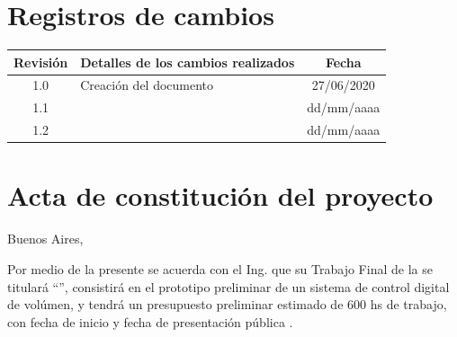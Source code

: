 \documentclass[11pt]{charter}
\begin{document}
\maketitle
\thispagestyle{empty}
\pagebreak


\thispagestyle{empty}
{\setlength{\parskip}{0pt}
\tableofcontents{}
}
\pagebreak


\section{Registros de cambios}
\label{sec:registro}


\begin{table}[ht]
\label{tab:registro}
\centering
\begin{tabularx}{\linewidth}{@{}|c|X|c|@{}}
\hline
\rowcolor[HTML]{C0C0C0} 
Revisión & \multicolumn{1}{c|}{\cellcolor[HTML]{C0C0C0}Detalles de los cambios realizados} & Fecha      \\ \hline
1.0      & Creación del documento                                          & 27/06/2020 \\ \hline
1.1      &                                                                 & dd/mm/aaaa \\ \hline
1.2      &                                                                 & dd/mm/aaaa \\ \hline
\end{tabularx}
\end{table}

\pagebreak



\section{Acta de constitución del proyecto}
\label{sec:acta}

\begin{flushright}
Buenos Aires, \fechaInicioName
\end{flushright}

\vspace{2cm}

Por medio de la presente se acuerda con el Ing. \authorname\hspace{1px} que su Trabajo Final de la \degreename\hspace{1px} se titulará ``\ttitle'', consistirá en el prototipo preliminar de un sistema de control digital de volúmen, y tendrá un presupuesto preliminar estimado de 600 hs de trabajo, con fecha de inicio \fechaInicioName\hspace{1px} y fecha de presentación pública \fechaFinalName.
\end{document}
